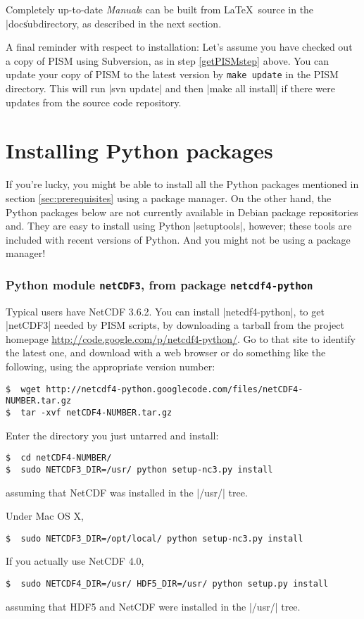 \documentclass[11pt,final]{amsart}
\begin{document}
Completely up-to-date \emph{Manual}s can be built from \LaTeX~source in the |doc\| subdirectory, as described in the next section.

A final reminder with respect to installation: Let's assume you have checked out a copy of PISM using Subversion, as in step \ref{getPISMstep} above.  You can update your copy of PISM to the latest version by \verb|make update| in the PISM directory.  This will run |svn update| and then |make all install| if there were updates from the source code repository.


\newpage
\section{Installing Python packages}
\label{sec:python}

If you're lucky, you might be able to install all the Python packages mentioned in section \ref{sec:prerequisites} using a package manager. On the other hand, the Python packages below are not currently available in Debian package repositories and.  They are easy to install using Python |setuptools|, however; these tools are included with recent versions of Python.  And you might not be using a package manager!

\subsubsection*{Python module \texttt{netCDF3}, from package \texttt{netcdf4-python}}  Typical users have NetCDF 3.6.2.  You can install |netcdf4-python|, to get |netCDF3| needed by PISM scripts, by downloading a tarball from the project homepage \url{http://code.google.com/p/netcdf4-python/}.  Go to that site to identify the latest one, and download with a web browser or do something like the following, using the appropriate version number:
\begin{verbatim}
$  wget http://netcdf4-python.googlecode.com/files/netCDF4-NUMBER.tar.gz
$  tar -xvf netCDF4-NUMBER.tar.gz
\end{verbatim}
Enter the directory you just untarred and install:
\begin{verbatim}
$  cd netCDF4-NUMBER/
$  sudo NETCDF3_DIR=/usr/ python setup-nc3.py install
\end{verbatim}
assuming that NetCDF was installed in the |/usr/| tree.

Under Mac OS X,
\begin{verbatim}
$  sudo NETCDF3_DIR=/opt/local/ python setup-nc3.py install
\end{verbatim}
If you actually use NetCDF 4.0,
\begin{verbatim}
$  sudo NETCDF4_DIR=/usr/ HDF5_DIR=/usr/ python setup.py install
\end{verbatim}
assuming that HDF5 and NetCDF were installed in the |/usr/| tree.
\end{document}
